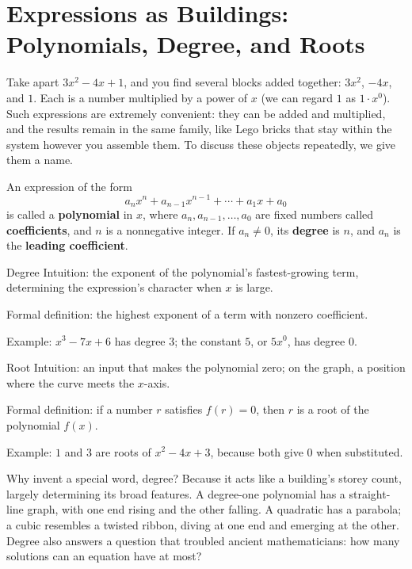 \section{Expressions as Buildings: Polynomials, Degree, and Roots}

Take apart $3x^2-4x+1$, and you find several blocks added together: $3x^2$, $-4x$, and $1$. Each is a number multiplied by a power of $x$ (we can regard $1$ as $1\cdot x^0$). Such expressions are extremely convenient: they can be added and multiplied, and the results remain in the same family, like Lego bricks that stay within the system however you assemble them. To discuss these objects repeatedly, we give them a name.

\begin{dingyi}[Polynomial]
An expression of the form
\[
a_n x^n + a_{n-1} x^{n-1} + \cdots + a_1 x + a_0
\]
is called a \textbf{polynomial} in $x$, where $a_n, a_{n-1}, \ldots, a_0$ are fixed numbers called \textbf{coefficients}, and $n$ is a nonnegative integer. If $a_n \neq 0$, its \textbf{degree} is $n$, and $a_n$ is the \textbf{leading coefficient}.
\end{dingyi}

\begin{shuyu}{Degree}
Intuition: the exponent of the polynomial's fastest-growing term, determining the expression's character when $x$ is large.

Formal definition: the highest exponent of a term with nonzero coefficient.

Example: $x^3-7x+6$ has degree $3$; the constant $5$, or $5x^0$, has degree $0$.
\end{shuyu}

\begin{shuyu}{Root}
Intuition: an input that makes the polynomial zero; on the graph, a position where the curve meets the $x$-axis.

Formal definition: if a number $r$ satisfies $f(r)=0$, then $r$ is a root of the polynomial $f(x)$.

Example: $1$ and $3$ are roots of $x^2-4x+3$, because both give $0$ when substituted.
\end{shuyu}

Why invent a special word, degree? Because it acts like a building's storey count, largely determining its broad features. A degree-one polynomial has a straight-line graph, with one end rising and the other falling. A quadratic has a parabola; a cubic resembles a twisted ribbon, diving at one end and emerging at the other. Degree also answers a question that troubled ancient mathematicians: how many solutions can an equation have at most?

